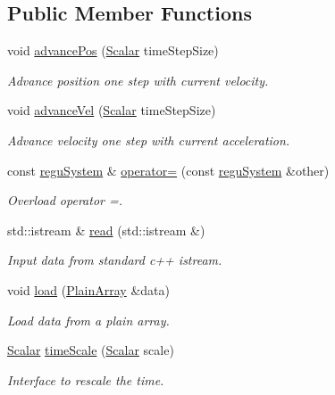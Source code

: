 \subsection*{Public Member Functions}
\begin{DoxyCompactItemize}
\item 
void \mbox{\hyperlink{classregu_system_ab1964e22d3d7f6ddaa51c5e7a02534a5}{advance\+Pos}} (\mbox{\hyperlink{classregu_system_aca8ee2c387943164ee3ea68370fc3ac0}{Scalar}} time\+Step\+Size)
\begin{DoxyCompactList}\small\item\em Advance position one step with current velocity. \end{DoxyCompactList}\item 
void \mbox{\hyperlink{classregu_system_ae00564e4aceeec7ce3a8aa6a158aa53e}{advance\+Vel}} (\mbox{\hyperlink{classregu_system_aca8ee2c387943164ee3ea68370fc3ac0}{Scalar}} time\+Step\+Size)
\begin{DoxyCompactList}\small\item\em Advance velocity one step with current acceleration. \end{DoxyCompactList}\item 
const \mbox{\hyperlink{classregu_system}{regu\+System}} \& \mbox{\hyperlink{classregu_system_a894081d40cb90418f791ab52e3c64d5f}{operator=}} (const \mbox{\hyperlink{classregu_system}{regu\+System}} \&other)
\begin{DoxyCompactList}\small\item\em Overload operator =. \end{DoxyCompactList}\item 
std\+::istream \& \mbox{\hyperlink{classregu_system_ae26daf3f6058c1be67fb00366706e2e4}{read}} (std\+::istream \&)
\begin{DoxyCompactList}\small\item\em Input data from standard c++ istream. \end{DoxyCompactList}\item 
void \mbox{\hyperlink{classregu_system_a4da424f127c024fcbef32eff3147b2ff}{load}} (\mbox{\hyperlink{classregu_system_ae2ca73edf865e016a858b694c1d2b49a}{Plain\+Array}} \&data)
\begin{DoxyCompactList}\small\item\em Load data from a plain array. \end{DoxyCompactList}\item 
\mbox{\hyperlink{classregu_system_aca8ee2c387943164ee3ea68370fc3ac0}{Scalar}} \mbox{\hyperlink{classregu_system_ad9aa4594055c550b56cda4242d498d45}{time\+Scale}} (\mbox{\hyperlink{classregu_system_aca8ee2c387943164ee3ea68370fc3ac0}{Scalar}} scale)
\begin{DoxyCompactList}\small\item\em Interface to rescale the time. \end{DoxyCompactList}\end{DoxyCompactItemize}
